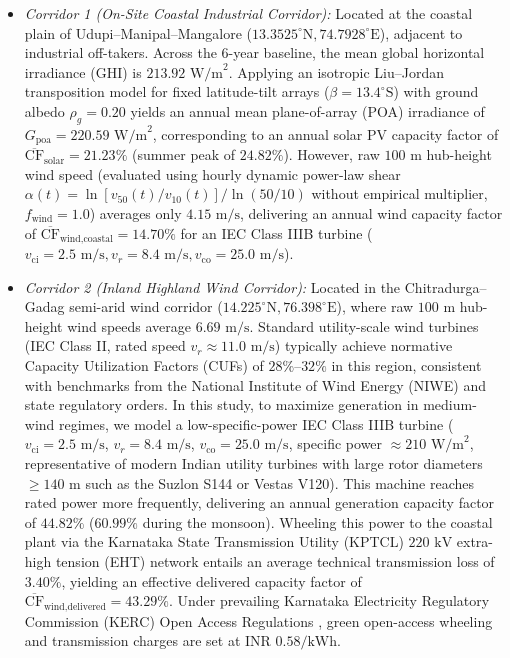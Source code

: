 \documentclass[conference]{IEEEtran}
\begin{document}
\begin{itemize}
    \item \textit{Corridor 1 (On-Site Coastal Industrial Corridor):} Located at the coastal plain of Udupi--Manipal--Mangalore ($13.3525^\circ\text{N}, 74.7928^\circ\text{E}$), adjacent to industrial off-takers. Across the 6-year baseline, the mean global horizontal irradiance (GHI) is $213.92\text{ W/m}^2$. Applying an isotropic Liu--Jordan transposition model for fixed latitude-tilt arrays ($\beta = 13.4^\circ\text{S}$) with ground albedo $\rho_g = 0.20$ yields an annual mean plane-of-array (POA) irradiance of $G_{\text{poa}} = 220.59\text{ W/m}^2$, corresponding to an annual solar PV capacity factor of $\overline{\text{CF}}_{\text{solar}} = 21.23\%$ (summer peak of $24.82\%$). However, raw $100\text{ m}$ hub-height wind speed (evaluated using hourly dynamic power-law shear $\alpha(t) = \ln[v_{50}(t)/v_{10}(t)]/\ln(50/10)$ without empirical multiplier, $f_{\text{wind}} = 1.0$) averages only $4.15\text{ m/s}$, delivering an annual wind capacity factor of $\overline{\text{CF}}_{\text{wind,coastal}} = 14.70\%$ for an IEC Class IIIB turbine ($v_{\text{ci}} = 2.5\text{ m/s}, v_r = 8.4\text{ m/s}, v_{\text{co}} = 25.0\text{ m/s}$).
    \item \textit{Corridor 2 (Inland Highland Wind Corridor):} Located in the Chitradurga--Gadag semi-arid wind corridor ($14.225^\circ\text{N}, 76.398^\circ\text{E}$), where raw $100\text{ m}$ hub-height wind speeds average $6.69\text{ m/s}$. Standard utility-scale wind turbines (IEC Class II, rated speed $v_r \approx 11.0\text{ m/s}$) typically achieve normative Capacity Utilization Factors (CUFs) of $28\%\text{--}32\%$ in this region, consistent with benchmarks from the National Institute of Wind Energy (NIWE) and state regulatory orders. In this study, to maximize generation in medium-wind regimes, we model a low-specific-power IEC Class IIIB turbine ($v_{\text{ci}} = 2.5\text{ m/s}$, $v_r = 8.4\text{ m/s}$, $v_{\text{co}} = 25.0\text{ m/s}$, specific power $\approx 210\text{ W/m}^2$, representative of modern Indian utility turbines with large rotor diameters $\ge 140\text{ m}$ such as the Suzlon S144 or Vestas V120). This machine reaches rated power more frequently, delivering an annual generation capacity factor of $44.82\%$ ($60.99\%$ during the monsoon). Wheeling this power to the coastal plant via the Karnataka State Transmission Utility (KPTCL) $220\text{ kV}$ extra-high tension (EHT) network entails an average technical transmission loss of $3.40\%$, yielding an effective delivered capacity factor of $\overline{\text{CF}}_{\text{wind,delivered}} = 43.29\%$. Under prevailing Karnataka Electricity Regulatory Commission (KERC) Open Access Regulations \cite{kerc2024}, green open-access wheeling and transmission charges are set at $\text{INR } 0.58/\text{kWh}$.
\end{itemize}
\end{document}
